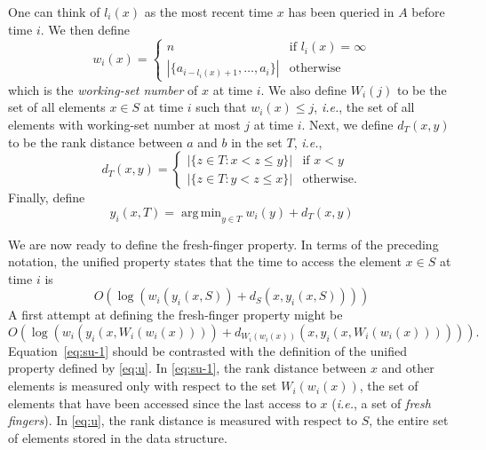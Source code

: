 \documentclass{llncs}
\newcommand{\ie}{\textsl{i.e.}}
\newcommand{\BigOh}[1]{O\!\left(#1\right)}
\DeclareMathOperator*{\argmin}{arg\,min}
\begin{document}
One can think of $l_i(x)$ as the most recent time $x$ has been queried in $A$ before time $i$. We then define
\begin{displaymath}
	w_i(x) =
		\begin{cases}
			n 																	& \text{if } l_i(x) = \infty \\
			|\{ a_{i-l_i(x)+1}, \ldots, a_i \}|	& \text{otherwise}
		\end{cases} 
\end{displaymath}
which is the \emph{working-set number} of $x$ at time $i$. We also define $W_i(j)$ to be the set of all elements $x \in S$ at time $i$ such that $w_i(x) \le j$, \ie, the set of all elements with working-set number at most $j$ at time $i$.  Next, we define $d_T(x,y)$ to be the rank distance between $a$ and $b$ in the set $T$, \ie,
\[
   d_T(x,y) 
    = \begin{cases}   
      |\{z\in T: x< z \le y\}| & \text{if $x<y$} \\
      |\{z\in T: y< z \le x\}| & \text{otherwise.}
    \end{cases}
\]
Finally, define
\begin{displaymath}
	y_i(x, T) = \argmin_{y \in T} w_i(y) + d_T(x,y)
\end{displaymath}

We are now ready to define the fresh-finger property. In terms of the preceding notation, the unified property states that the time to access the element $x \in S$ at time $i$ is 
\begin{equation}
	\BigOh{\log (w_i(y_i(x,S)) + d_S(x,y_i(x,S)))}
        \label{eq:u}
\end{equation}
A first attempt at defining the fresh-finger property might be 
\begin{equation}
	\BigOh{\log (w_i(y_i(x,W_i(w_i(x)))) + d_{W_i(w_i(x))}(x,y_i(x,W_i(w_i(x)))))}. \label{eq:su-1}
\end{equation}
Equation~\eqref{eq:su-1} should be contrasted with the definition of the unified property defined by \eqref{eq:u}.  In \eqref{eq:su-1}, the rank distance between $x$ and other elements is measured only with respect to the set $W_i(w_i(x))$, the set of elements that have been accessed since the last access to $x$ (\ie, a set of \emph{fresh fingers}).  In \eqref{eq:u}, the rank distance is measured with respect to $S$, the entire set of elements stored in the data structure.
\end{document}
